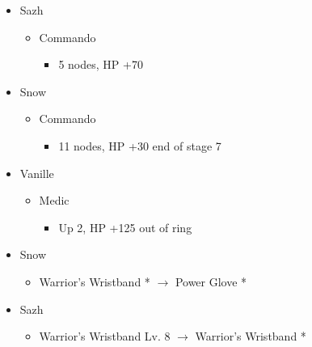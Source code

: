 \begin{paracol}{2}
\begin{menu}
\begin{itemize}
\begin{itemize}
			      {\paradigmline[2]{\textit{\com}}{\textit{\com}}{\textit{\com}}}%
			      {\paradigmline{(\rav)}{\sen}{(\rav)}}%
			      {\paradigmline{(\com)}{(\sen)}{\med}}%
			      {\paradigmline{\rav}{(\com)}{(\rav)}}%
			      {\paradigmline{\rav}{\rav}{\rav}}
		\end{itemize}
		\crystarium
		\begin{itemize}
			\item Sazh
			      \begin{itemize}
				      \item Commando
				            \begin{itemize}
					            \item 5 nodes, HP +70
				            \end{itemize}
			      \end{itemize}
			\item Snow
			      \begin{itemize}
				      \item Commando
				            \begin{itemize}
					            \item 11 nodes, HP +30 end of stage 7
				            \end{itemize}
			      \end{itemize}
			\item Vanille
			      \begin{itemize}
				      \item Medic
				            \begin{itemize}
					            \item Up 2, HP +125 out of ring
				            \end{itemize}
			      \end{itemize}
		\end{itemize}
		\equip
		\begin{itemize}
			\item Snow
			      \begin{itemize}
				      \item Warrior's Wristband * $\rightarrow$ Power Glove *
			      \end{itemize}
			\item Sazh
			      \begin{itemize}
				      \item Warrior's Wristband Lv. 8 $\rightarrow$ Warrior's Wristband *
			      \end{itemize}
		\end{itemize}
	\end{itemize}
\end{menu}


\end{paracol}
